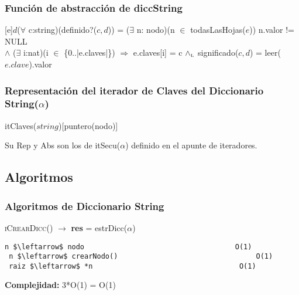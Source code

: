 



\subsubsection{Funci\'on de abstracci\'on de diccString}
 [e]{$d$}{($\forall$ c:string)(definido?($c,d$)) = ($\exists$ n: nodo)(n $\in$ todasLasHojas($e$)) n.valor != NULL \\ $\land$ ($\exists$ i:nat)(i $\in$ \{0..|e.claves|\}) $\Rightarrow$ e.claves[i] = c $\land_{\mathrm{\scriptscriptstyle{L}}}$ significado($c,d$) = leer($e.clave$).valor}

  \subsubsection{Representaci\'on del iterador de Claves del Diccionario String($\alpha$)}



    \begin{Estructura}{itClaves($string$)}[puntero(nodo)]
    \end{Estructura}

    Su Rep y Abs son los de itSecu($\alpha$) definido en el apunte de iteradores.

  \subsection{Algoritmos}
\subsubsection{Algoritmos de Diccionario String}

\textsc{iCrearDicc}() $\rightarrow$ \textbf{res} = estrDicc($\alpha$)
\begin{lstlisting}[mathescape]
 n $\leftarrow$ nodo									O(1)
 n $\leftarrow$ crearNodo() 								O(1)
 raiz $\leftarrow$ *n 									O(1)
\end{lstlisting}
\textbf{Complejidad:} 3*O(1) = O(1)

